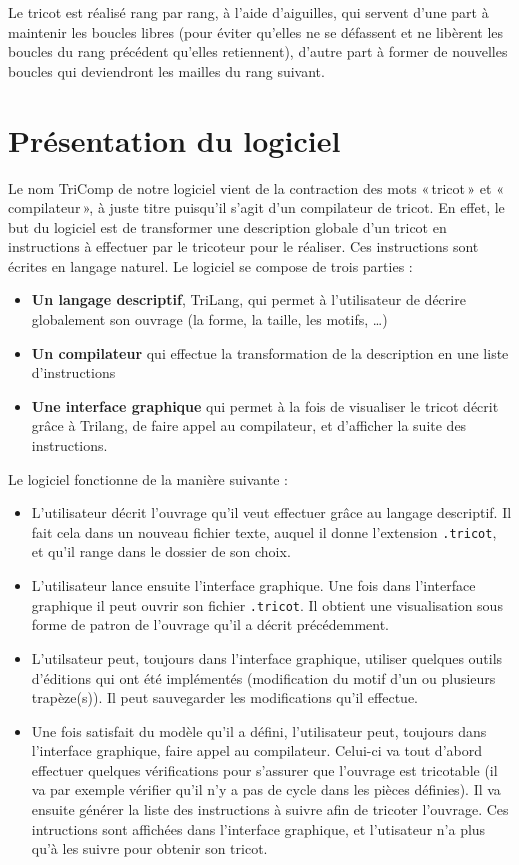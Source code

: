 \documentclass{article}
\begin{document}
Le tricot est réalisé rang par rang, à l'aide d'aiguilles, qui servent 
d'une part à maintenir les boucles libres (pour éviter qu'elles ne se 
défassent et ne libèrent les boucles du rang précédent qu'elles retiennent), 
d'autre part à former de nouvelles boucles qui deviendront les mailles du rang 
suivant.

\newpage

\section{Présentation du logiciel}

Le nom TriComp de notre logiciel vient de la contraction des mots «\,tricot\,» et «\,compilateur\,», 
à juste titre puisqu'il s'agit d'un compilateur de tricot. En effet, le but du logiciel est de 
transformer une description globale d'un tricot en instructions à effectuer par le tricoteur 
pour le réaliser. Ces instructions sont écrites en langage naturel. Le logiciel se compose de trois parties :
\begin{itemize}
 \item \textbf{Un langage descriptif}, TriLang, qui permet à l'utilisateur de décrire globalement son ouvrage (la forme, la taille, les motifs, \dots)
 \item \textbf{Un compilateur} qui effectue la transformation de la description en une liste d'instructions
 \item \textbf{Une interface graphique} qui permet à la fois de visualiser le tricot décrit grâce à Trilang, 
   de faire appel au compilateur, et d'afficher la suite des instructions. \\
\end{itemize}

Le logiciel fonctionne de la manière suivante :
\begin{itemize}
 \item L'utilisateur décrit l'ouvrage qu'il veut effectuer grâce au langage descriptif. Il fait cela dans un nouveau fichier texte, auquel il donne l'extension \texttt{.tricot}, et qu'il range dans le dossier de son choix.
 \item L'utilisateur lance ensuite l'interface graphique. Une fois dans l'interface graphique il peut ouvrir son fichier \texttt{.tricot}. Il obtient une visualisation sous forme de patron de l'ouvrage qu'il a décrit précédemment.
 \item L'utilsateur peut, toujours dans l'interface graphique, utiliser quelques outils d'éditions qui ont été implémentés (modification du motif d'un ou plusieurs trapèze(s)). Il peut sauvegarder les modifications qu'il effectue.
 \item Une fois satisfait du modèle qu'il a défini, l'utilisateur peut, toujours dans l'interface graphique, faire appel au compilateur. Celui-ci va tout d'abord effectuer quelques vérifications pour s'assurer que l'ouvrage est tricotable (il va par exemple vérifier qu'il n'y a pas de cycle dans les pièces définies). Il va ensuite générer la liste des instructions à suivre afin de tricoter l'ouvrage. Ces intructions sont affichées dans l'interface graphique, et l'utisateur n'a plus qu'à les suivre pour obtenir son tricot.
\end{itemize}
\end{document}
